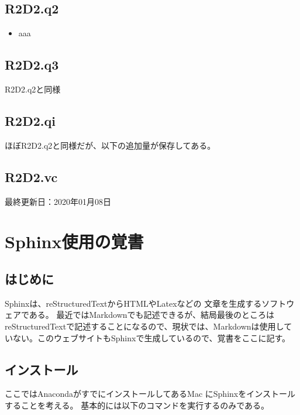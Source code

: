 \documentclass[letterpaper,10pt,dvipdfmx,report]{sphinxmanual}
\begin{document}
\section{R2D2.q2}
\label{\detokenize{notation:r2d2-q2}}\begin{itemize}
\item {} 
aaa

\end{itemize}


\section{R2D2.q3}
\label{\detokenize{notation:r2d2-q3}}
R2D2.q2と同様


\section{R2D2.qi}
\label{\detokenize{notation:r2d2-qi}}
ほぼR2D2.q2と同様だが、以下の追加量が保存してある。


\section{R2D2.vc}
\label{\detokenize{notation:r2d2-vc}}
最終更新日：2020年01月08日


\chapter{Sphinx使用の覚書}
\label{\detokenize{sphinx:sphinx}}\label{\detokenize{sphinx::doc}}

\section{はじめに}
\label{\detokenize{sphinx:id1}}
Sphinxは、reStructuredTextからHTMLやLatexなどの
文章を生成するソフトウェアである。
最近ではMarkdownでも記述できるが、結局最後のところはreStructuredTextで記述することになるので、現状では、Markdownは使用していない。このウェブサイトもSphinxで生成しているので、覚書をここに記す。


\section{インストール}
\label{\detokenize{sphinx:id3}}
ここではAnacondaがすでにインストールしてあるMac
にSphinxをインストールすることを考える。
基本的には以下のコマンドを実行するのみである。
\end{document}
